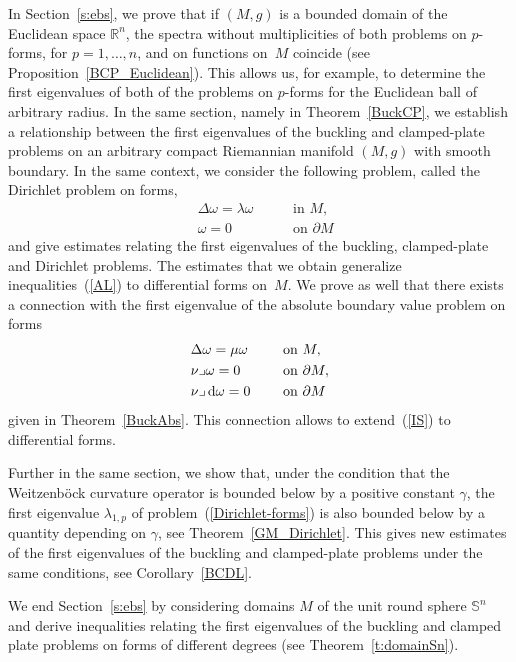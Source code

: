 \documentclass[10pt,a4paper]{amsart}
\newcommand{\R}{{\mathbb R}}
\numberwithin{equation}{section}
\theoremstyle{definition}
\begin{document}
In Section~\ref{s:ebs}, we prove that if $(M,g)$ is a bounded domain of the Euclidean space $\R^n$, the spectra without multiplicities of both problems on $p$-forms, for $p=1,\dots,n$, and on functions on~$M$ coincide (see Proposition~\ref{BCP_Euclidean}).
This allows us, for example, to determine the first eigenvalues of both of the problems on $p$-forms for the Euclidean ball of arbitrary radius.
In the same section, namely in Theorem~\ref{BuckCP}, we establish a relationship between the first eigenvalues of the buckling and clamped-plate problems on an arbitrary compact Riemannian manifold $(M,g)$ with smooth boundary.
In the same context, we consider the following problem, called the Dirichlet problem on forms,
\begin{equation}
\begin{aligned}
&\Delta \omega =\lambda \omega\ \quad &&\textrm{in } M, \\
&\omega = 0\ \quad &&\textrm{on } \partial M
\end{aligned}\label{Dirichlet-forms}
\end{equation}
and give estimates relating the first eigenvalues of the buckling, clamped-plate and Dirichlet problems. The estimates that we obtain generalize inequalities~(\ref{AL}) to differential forms on~$M$.
We prove as well that there exists a connection %
with the first eigenvalue of the absolute boundary value problem on forms
\[
\begin{aligned}
&\Delta \omega =\mu \omega \ \quad&&\textrm{on } M, \\
&\nu\lrcorner \omega = 0 \ \quad&& \textrm{on } \partial M, \\
&\nu \lrcorner \, {\rm d}\omega = 0 \ \quad&& \textrm{on } \partial M
\end{aligned}
\]
given in Theorem~\ref{BuckAbs}.
This connection allows to extend~(\ref{IS}) to differential forms.

Further in the same section, we show that, under the condition that the Weitzenb\"ock curvature operator is bounded below by a positive constant $\gamma$, the first eigenvalue $\lambda_{1,p}$ of problem~(\ref{Dirichlet-forms}) is also bounded below by a quantity depending on $\gamma$, see Theorem~\ref{GM_Dirichlet}.
This gives new estimates of the first eigenvalues of the buckling and clamped-plate problems under the same conditions, see Corollary~\ref{BCDL}.

We end Section~\ref{s:ebs} by considering domains $M$ of the unit round sphere $\mathbb{S}^n$ and derive inequalities relating the first eigenvalues of the buckling and clamped plate problems on forms of different degrees (see Theorem~\ref{t:domainSn}).
\end{document}
